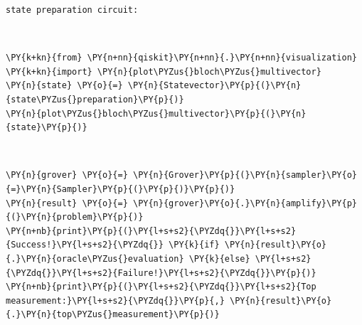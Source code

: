    \begin{Verbatim}[commandchars=\\\{\}]
state preparation circuit:
    \end{Verbatim}
 
            
    
    \begin{center}
    \end{center}
    { \hspace*{\fill} \\}
    

    \begin{tcolorbox}[breakable, size=fbox, boxrule=1pt, pad at break*=1mm,colback=cellbackground, colframe=cellborder]
\begin{Verbatim}[commandchars=\\\{\}]
\PY{k+kn}{from} \PY{n+nn}{qiskit}\PY{n+nn}{.}\PY{n+nn}{visualization} \PY{k+kn}{import} \PY{n}{plot\PYZus{}bloch\PYZus{}multivector}
\PY{n}{state} \PY{o}{=} \PY{n}{Statevector}\PY{p}{(}\PY{n}{state\PYZus{}preparation}\PY{p}{)}
\PY{n}{plot\PYZus{}bloch\PYZus{}multivector}\PY{p}{(}\PY{n}{state}\PY{p}{)}
\end{Verbatim}
\end{tcolorbox}
 
            
    
    \begin{center}
    \end{center}
    { \hspace*{\fill} \\}
    

    \begin{tcolorbox}[breakable, size=fbox, boxrule=1pt, pad at break*=1mm,colback=cellbackground, colframe=cellborder]
\begin{Verbatim}[commandchars=\\\{\}]
\PY{n}{grover} \PY{o}{=} \PY{n}{Grover}\PY{p}{(}\PY{n}{sampler}\PY{o}{=}\PY{n}{Sampler}\PY{p}{(}\PY{p}{)}\PY{p}{)}
\PY{n}{result} \PY{o}{=} \PY{n}{grover}\PY{o}{.}\PY{n}{amplify}\PY{p}{(}\PY{n}{problem}\PY{p}{)}
\PY{n+nb}{print}\PY{p}{(}\PY{l+s+s2}{\PYZdq{}}\PY{l+s+s2}{Success!}\PY{l+s+s2}{\PYZdq{}} \PY{k}{if} \PY{n}{result}\PY{o}{.}\PY{n}{oracle\PYZus{}evaluation} \PY{k}{else} \PY{l+s+s2}{\PYZdq{}}\PY{l+s+s2}{Failure!}\PY{l+s+s2}{\PYZdq{}}\PY{p}{)}
\PY{n+nb}{print}\PY{p}{(}\PY{l+s+s2}{\PYZdq{}}\PY{l+s+s2}{Top measurement:}\PY{l+s+s2}{\PYZdq{}}\PY{p}{,} \PY{n}{result}\PY{o}{.}\PY{n}{top\PYZus{}measurement}\PY{p}{)}
\end{Verbatim}
\end{tcolorbox}

